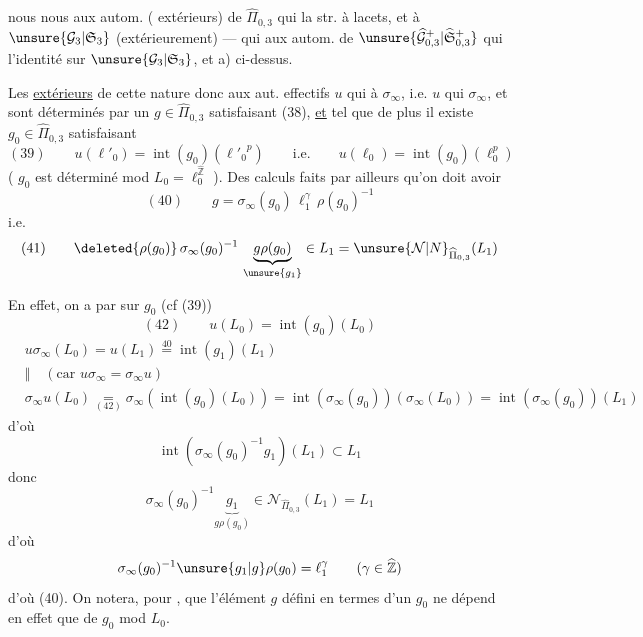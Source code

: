 

 nous nous  aux autom.
( extérieurs) de $\widehat{\Pi}_{0,3}$
qui  la str. à lacets, et  à
$\unsure{\mathcal G_3|\mathfrak S_3}$ (extérieurement)
--- qui  aux autom.
 de
$\unsure{\widehat{\mathcal G}_{0,3}^{+}|\widehat{\mathfrak S}_{0,3}^{+}}$ qui 
l'identité sur $\unsure{\mathcal G_3|\mathfrak S_3}$,
et  a) ci-dessus. 

Les  \uline{extérieurs} de cette nature
 donc aux aut. effectifs $u$
qui  à $\sigma_\infty$, i.e. $u$ qui
 $\sigma_\infty$, et sont déterminés par un
$g\in\widehat{\Pi}_{0,3}$ satisfaisant (38), \uline{et} tel que
de plus il existe 
$g_0\in\widehat{\Pi}_{0,3}$ satisfaisant
\[
(39)\qquad
u(\ell'_0)=\operatorname{int}(g_0)({\ell'_0}^{p})
\qquad\text{i.e.}\qquad
u(\ell_0)=\operatorname{int}(g_0)(\ell_0^{p})
\]
( $g_0$ est déterminé mod $L_0=\ell_0^{\widehat{\mathbb Z}}$
\unsure{\ldots}). Des calculs faits par ailleurs 
 qu'on doit avoir
\[
(40)\qquad g=\sigma_\infty(g_0)\,\ell_1^{\gamma}\,\rho(g_0)^{-1}
\]
i.e.
\[
(41)\qquad
\deleted{\rho(g_0)}\,\sigma_\infty(g_0)^{-1}\,
\underbrace{g\rho(g_0)}_{\unsure{g_1}}\in L_1
=\unsure{\mathcal N|N}_{\widehat{\Pi}_{0,3}}(L_1)
\]


En effet, on a par  sur $g_0$ (cf (39))
\[
(42)\qquad u(L_0)=\operatorname{int}(g_0)(L_0)
\]
\[
\begin{aligned}
&u\sigma_\infty(L_0)=u(L_1)\overset{40}{=}
  \operatorname{int}(g_1)(L_1)\\
&\Vert\quad(\text{car }u\sigma_\infty=\sigma_\infty u)\\
&\sigma_\infty u(L_0)\underset{(42)}{=}
 \sigma_\infty(\operatorname{int}(g_0)(L_0))
 =\operatorname{int}(\sigma_\infty(g_0))(\sigma_\infty(L_0))
 =\operatorname{int}(\sigma_\infty(g_0))(L_1)
\end{aligned}
\]
d'où
\[
\operatorname{int}(\sigma_\infty(g_0)^{-1}g_1)(L_1)\subset L_1
\]
donc
\[
\sigma_\infty(g_0)^{-1}\underbrace{g_1}_{g\rho(g_0)}
\in \mathcal N_{\widehat{\Pi}_{0,3}}(L_1)=L_1
\]
d'où
\[
\sigma_\infty(g_0)^{-1}\unsure{g_1|g}\rho(g_0)=\ell_1^\gamma
\qquad (\gamma\in\widehat{\mathbb Z})
\]
d'où (40). On notera, pour , que l'élément $g$
défini en termes d'un $g_0$ 
ne dépend en effet que de $g_0$ mod $L_0$. 

